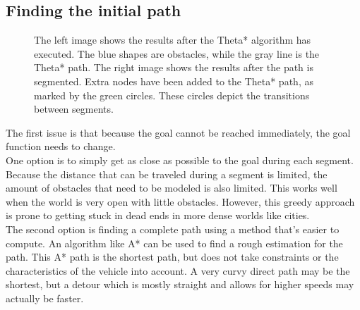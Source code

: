 \subsection{Finding the initial path}
\begin{figure}[!t]
    \centering
    \hfil
    \caption{The left image shows the results after the Theta* algorithm has executed. The blue shapes are obstacles, while the gray line is the Theta* path. The right image shows the results after the path is segmented. Extra nodes have been added to the Theta* path, as marked by the green circles. These circles depict the transitions between segments.}\label{fig:pre-1-2}
\end{figure}
The first issue is that because the goal cannot be reached immediately, the goal function needs to change.  \\
One option is to simply get as close as possible to the goal during each segment. Because the distance that can be traveled during a segment is limited, the amount of obstacles that need to be modeled is also limited. This works well when the world is very open with little obstacles. However, this greedy approach is prone to getting stuck in dead ends in more dense worlds like cities.
\\
The second option is finding a complete path using a method that's easier to compute. An algorithm like A* can be used to find a rough estimation for the path. This A* path is the shortest path, but does not take constraints or the characteristics of the vehicle into account. A very curvy direct path may be the shortest, but a detour which is mostly straight and allows for higher speeds may actually be faster. 
